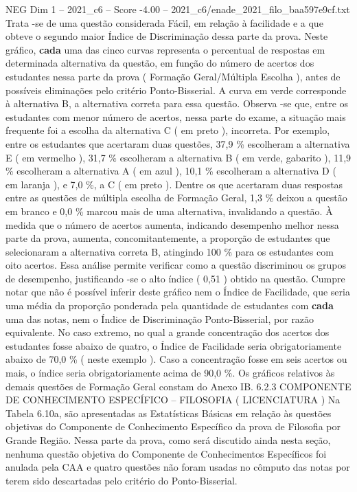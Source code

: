 \begin{textsample}{NEG Dim 1 – 2021\_c6 – Score -4.00 – 2021\_c6/enade\_2021\_filo\_baa597e9cf.txt}
Trata -se de uma questão considerada Fácil, em relação à facilidade e a que obteve o segundo maior Índice de Discriminação dessa parte da prova.
Neste gráfico, \textbf{cada} uma das cinco curvas representa o percentual de respostas em determinada alternativa da questão, em função do número de acertos dos estudantes nessa parte da prova ( Formação Geral/Múltipla Escolha ), antes de possíveis eliminações pelo critério Ponto-Bisserial.
A curva em verde corresponde à alternativa B, a alternativa correta para essa questão.
Observa -se que, entre os estudantes com menor número de acertos, nessa parte do exame, a situação mais frequente foi a escolha da alternativa C ( em preto ), incorreta.
Por exemplo, entre os estudantes que acertaram duas questões, 37,9 \% escolheram a alternativa E ( em vermelho ), 31,7 \% escolheram a alternativa B ( em verde, gabarito ), 11,9 \% escolheram a alternativa A ( em azul ), 10,1 \% escolheram a alternativa D ( em laranja ), e 7,0 \%, a C ( em preto ).
Dentre os que acertaram duas respostas entre as questões de múltipla escolha de Formação Geral, 1,3 \% deixou a questão em branco e 0,0 \% marcou mais de uma alternativa, invalidando a questão.
À medida que o número de acertos aumenta, indicando desempenho melhor nessa parte da prova, aumenta, concomitantemente, a proporção de estudantes que selecionaram a alternativa correta B, atingindo 100 \% para os estudantes com oito acertos.
Essa análise permite verificar como a questão discriminou os grupos de desempenho, justificando -se o alto índice ( 0,51 ) obtido na questão.
Cumpre notar que não é possível inferir deste gráfico nem o Índice de Facilidade, que seria uma média da proporção ponderada pela quantidade de estudantes com \textbf{cada} uma das notas, nem o Índice de Discriminação Ponto-Bisserial, por razão equivalente.
No caso extremo, no qual a grande concentração dos acertos dos estudantes fosse abaixo de quatro, o Índice de Facilidade seria obrigatoriamente abaixo de 70,0 \% ( neste exemplo ).
Caso a concentração fosse em seis acertos ou mais, o índice seria obrigatoriamente acima de 90,0 \%.
Os gráficos relativos às demais questões de Formação Geral constam do Anexo IB. 6.2.3 COMPONENTE DE CONHECIMENTO ESPECÍFICO – FILOSOFIA ( LICENCIATURA ) Na Tabela 6.10a, são apresentadas as Estatísticas Básicas em relação às questões objetivas do Componente de Conhecimento Específico da prova de Filosofia por Grande Região.
Nessa parte da prova, como será discutido ainda nesta seção, nenhuma questão objetiva do Componente de Conhecimentos Específicos foi anulada pela CAA e quatro questões não foram usadas no cômputo das notas por terem sido descartadas pelo critério do Ponto-Bisserial.

\end{textsample}
